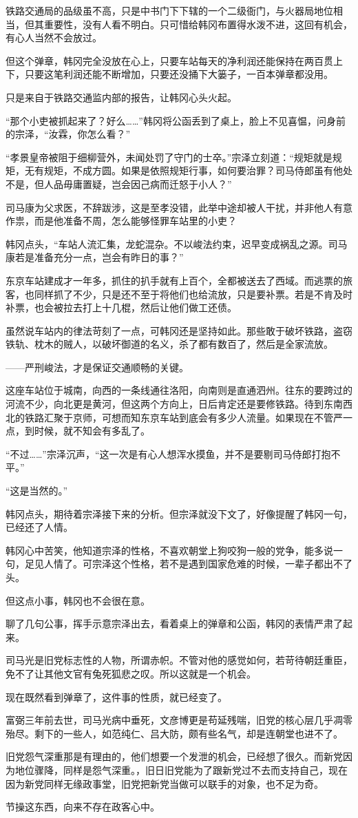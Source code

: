 铁路交通局的品级虽不高，只是中书门下下辖的一个二级衙门，与火器局地位相当，但其重要性，没有人看不明白。只可惜给韩冈布置得水泼不进，这回有机会，有心人当然不会放过。

但这个弹章，韩冈完全没放在心上，只要车站每天的净利润还能保持在两百贯上下，只要这笔利润还能不断增加，只要还没捅下大篓子，一百本弹章都没用。

只是来自于铁路交通监内部的报告，让韩冈心头火起。

“那个小吏被抓起来了？好么……”韩冈将公函丢到了桌上，脸上不见喜愠，问身前的宗泽，“汝霖，你怎么看？”

“孝景皇帝被阻于细柳营外，未闻处罚了守门的士卒。”宗泽立刻道：“规矩就是规矩，无有规矩，不成方圆。如果是依照规矩行事，如何要治罪？司马侍郎虽有他处不是，但人品毋庸置疑，岂会因己病而迁怒于小人？”

司马康为父求医，不辞跋涉，这是至孝没错，此举中途却被人干扰，并非他人有意作祟，而是他准备不周，怎么能够怪罪车站里的小吏？

韩冈点头，“车站人流汇集，龙蛇混杂。不以峻法约束，迟早变成祸乱之源。司马康若是准备充分一点，岂会有昨日的事？”

东京车站建成才一年多，抓住的扒手就有上百个，全都被送去了西域。而逃票的旅客，也同样抓了不少，只是还不至于将他们也给流放，只是要补票。若是不肯及时补票，也会被拉去打上十几棍，然后让他们做工还债。

虽然说车站内的律法苛刻了一点，可韩冈还是坚持如此。那些敢于破坏铁路，盗窃铁轨、枕木的贼人，以破坏御道的名义，杀了都有数百了，然后是全家流放。

——严刑峻法，才是保证交通顺畅的关键。

这座车站位于城南，向西的一条线通往洛阳，向南则是直通泗州。往东的要跨过的河流不少，向北更是黄河，但这两个方向上，日后肯定还是要修铁路。待到东南西北的铁路汇聚于京师，可想而知东京车站到底会有多少人流量。如果现在不管严一点，到时候，就不知会有多乱了。

“不过……”宗泽沉声，“这一次是有心人想浑水摸鱼，并不是要剔司马侍郎打抱不平。”

“这是当然的。”

韩冈点头，期待着宗泽接下来的分析。但宗泽就没下文了，好像提醒了韩冈一句，已经还了人情。

韩冈心中苦笑，他知道宗泽的性格，不喜欢朝堂上狗咬狗一般的党争，能多说一句，足见人情了。可宗泽这个性格，若不是遇到国家危难的时候，一辈子都出不了头。

但这点小事，韩冈也不会很在意。

聊了几句公事，挥手示意宗泽出去，看着桌上的弹章和公函，韩冈的表情严肃了起来。

司马光是旧党标志性的人物，所谓赤帜。不管对他的感觉如何，若苛待朝廷重臣，免不了让其他文官有兔死狐悲之叹。所以这就是一个机会。

现在既然看到弹章了，这件事的性质，就已经变了。

富弼三年前去世，司马光病中垂死，文彦博更是苟延残喘，旧党的核心层几乎凋零殆尽。剩下的一些人，如范纯仁、吕大防，颇有些名气，却是连朝堂也进不了。

旧党怨气深重那是有理由的，他们想要一个发泄的机会，已经想了很久。而新党因为地位骤降，同样是怨气深重。，旧日旧党能为了跟新党过不去而支持自己，现在因为新党同样无缘政事堂，旧党把新党当做可以联手的对象，也不足为奇。

节操这东西，向来不存在政客心中。
